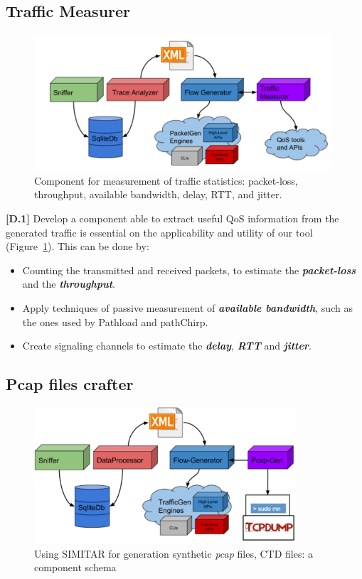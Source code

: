 \subsection{Traffic Measurer}

\begin{figure}[!ht]
    \centering
    \includegraphics[height=2.0in]{figures/ch6/traffic-measurer}
    \caption{Component for measurement of traffic statistics: packet-loss, throughput, available bandwidth, delay, RTT, and jitter.}
    \label{fig:traffic-measurer}
\end{figure}


\textbf{[D.1]} Develop a component able to extract useful QoS information from the generated traffic is essential on the applicability and utility of our tool (Figure~\ref{fig:traffic-measurer}). This can be done by:
\begin{itemize}
\item Counting the transmitted and received packets, to estimate the \textit{\textbf{packet-loss}} and the \textit{\textbf{throughput}}.
\item Apply techniques of passive measurement of \textit{\textbf{available bandwidth}}, such as the ones used by Pathload\cite{web-pathload} and pathChirp\cite{pathchirp-paper}\cite{web-pathchirp}.
\item Create signaling channels to estimate the \textit{\textbf{delay}}, \textit{\textbf{RTT}} and \textit{\textbf{jitter}}. 
\end{itemize}

\subsection{Pcap files crafter}

\begin{figure}[!ht]
    \centering
    \includegraphics[height=2.0in]{figures/ch6/pcap-gen}
    \caption{Using SIMITAR for generation synthetic \textit{pcap} files, CTD files: a component schema}
    \label{fig:pcap-gen}
\end{figure}


